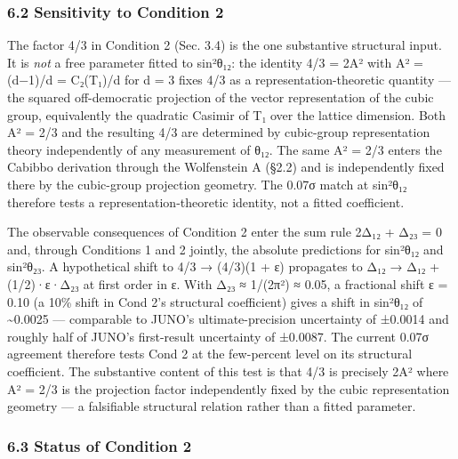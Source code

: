 \documentclass[
  11pt,
  letterpaper,
]{article}
\begin{document}
\hypertarget{sensitivity-to-condition-2}{%
\subsubsection{6.2 Sensitivity to Condition
2}\label{sensitivity-to-condition-2}}

The factor 4/3 in Condition 2 (Sec. 3.4) is the one substantive
structural input. It is \emph{not} a free parameter fitted to sin²θ₁₂:
the identity 4/3 = 2A² with A² = (d−1)/d = C₂(T₁)/d for d = 3 fixes 4/3
as a representation-theoretic quantity --- the squared off-democratic
projection of the vector representation of the cubic group, equivalently
the quadratic Casimir of T₁ over the lattice dimension. Both A² = 2/3
and the resulting 4/3 are determined by cubic-group representation
theory independently of any measurement of θ₁₂. The same A² = 2/3 enters
the Cabibbo derivation through the Wolfenstein A (§2.2) and is
independently fixed there by the cubic-group projection geometry. The
0.07σ match at sin²θ₁₂ therefore tests a representation-theoretic
identity, not a fitted coefficient.

The observable consequences of Condition 2 enter the sum rule 2Δ₁₂ + Δ₂₃
= 0 and, through Conditions 1 and 2 jointly, the absolute predictions
for sin²θ₁₂ and sin²θ₂₃. A hypothetical shift to 4/3 → (4/3)(1 + ε)
propagates to Δ₁₂ → Δ₁₂ + (1/2)·ε·Δ₂₃ at first order in ε. With Δ₂₃ ≈
1/(2π²) ≈ 0.05, a fractional shift ε = 0.10 (a 10\% shift in Cond 2's
structural coefficient) gives a shift in sin²θ₁₂ of
\textasciitilde0.0025 --- comparable to JUNO's ultimate-precision
uncertainty of ±0.0014 and roughly half of JUNO's first-result
uncertainty of ±0.0087. The current 0.07σ agreement therefore tests Cond
2 at the few-percent level on its structural coefficient. The
substantive content of this test is that 4/3 is precisely 2A² where A² =
2/3 is the projection factor independently fixed by the cubic
representation geometry --- a falsifiable structural relation rather
than a fitted parameter.

\hypertarget{status-of-condition-2}{%
\subsubsection{6.3 Status of Condition 2}\label{status-of-condition-2}}
\end{document}
